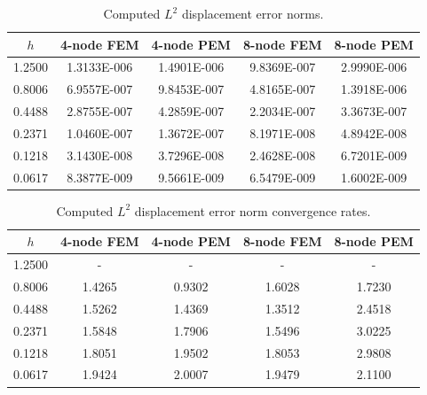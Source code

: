 \begin{table}[!ht]
  \begin{center}
    \begin{tabular}{| c | c | c | c | c |}
    \hline
    $h$ & 4-node FEM & 4-node PEM & 8-node FEM & 8-node PEM \\ \hline
    1.2500 & 1.3133E-006 & 1.4901E-006 & 9.8369E-007 & 2.9990E-006 \\ \hline
    0.8006 & 6.9557E-007 & 9.8453E-007 & 4.8165E-007 & 1.3918E-006 \\ \hline
    0.4488 & 2.8755E-007 & 4.2859E-007 & 2.2034E-007 & 3.3673E-007 \\ \hline
    0.2371 & 1.0460E-007 & 1.3672E-007 & 8.1971E-008 & 4.8942E-008 \\ \hline
    0.1218 & 3.1430E-008 & 3.7296E-008 & 2.4628E-008 & 6.7201E-009 \\ \hline
    0.0617 & 8.3877E-009 & 9.5661E-009 & 6.5479E-009 & 1.6002E-009 \\
    \hline
    \end{tabular}
    \caption{Computed $L^2$ displacement error norms.}
    \vspace{-5pt}
    \label{tab:l2_error}
    \vspace{-25pt}
  \end{center}
\end{table}
\begin{table}[!ht]
  \begin{center}
    \begin{tabular}{| c | c | c | c | c |}
    \hline
    $h$ & 4-node FEM & 4-node PEM & 8-node FEM & 8-node PEM \\ \hline
    1.2500 &	-	&	-	&	-	&       -      \\ \hline
    0.8006 &	1.4265	&	0.9302	&	1.6028	&	1.7230 \\ \hline
    0.4488 &	1.5262	&	1.4369	&	1.3512	&	2.4518 \\ \hline
    0.2371 &	1.5848	&	1.7906	&	1.5496	&	3.0225 \\ \hline
    0.1218 &	1.8051	&	1.9502	&	1.8053	&	2.9808 \\ \hline
    0.0617 &	1.9424	&	2.0007	&	1.9479	&	2.1100 \\
    \hline
    \end{tabular}
    \caption{Computed $L^2$ displacement error norm convergence rates.}
    \vspace{-5pt}
    \label{tab:l2_rates}
    \vspace{-25pt}
  \end{center}
\end{table}

